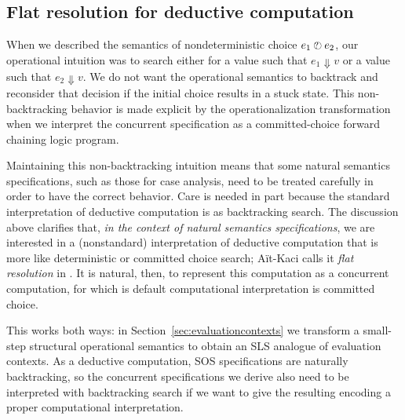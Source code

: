 

\subsection{Flat resolution for deductive computation}
\label{sec:flatresolution}

When we described the semantics of nondeterministic choice $e_1 \mathbin{\mbox{$\ocircle$\hspace{-7pt}{\footnotesize ?}\hspace{3pt}}}
e_2$, our operational intuition was to search either for a value such
that $e_1 \Downarrow v$ or a value such that $e_2 \Downarrow v$. We do
not want the operational semantics to backtrack and reconsider that
decision if the initial choice results in a stuck state. This
non-backtracking behavior is made explicit by the operationalization
transformation when we interpret the concurrent specification as a
committed-choice forward chaining logic program.

Maintaining this non-backtracking intuition means that some natural
semantics specifications, such as those for case analysis, need to be
treated carefully in order to have the correct behavior. Care is
needed in part because the standard
interpretation of deductive computation is as backtracking search.
The discussion above clarifies that, {\it in the context of natural
  semantics specifications}, we are interested in a (nonstandard) 
interpretation of deductive computation that is more like deterministic
or committed choice search; A{\"i}t-Kaci calls it {\it flat resolution}
 in \cite{aitkaci99warrens}. It is natural, then, to represent this
computation as a concurrent computation, for which is default
computational interpretation is committed choice.

This works both ways: in Section~\ref{sec:evaluationcontexts}
we transform a small-step structural operational semantics to obtain
an SLS analogue of evaluation contexts. As a deductive computation,
SOS specifications are naturally backtracking, so the concurrent
specifications we derive also need to be interpreted with backtracking
search if we want to give the resulting encoding a proper computational
interpretation.


